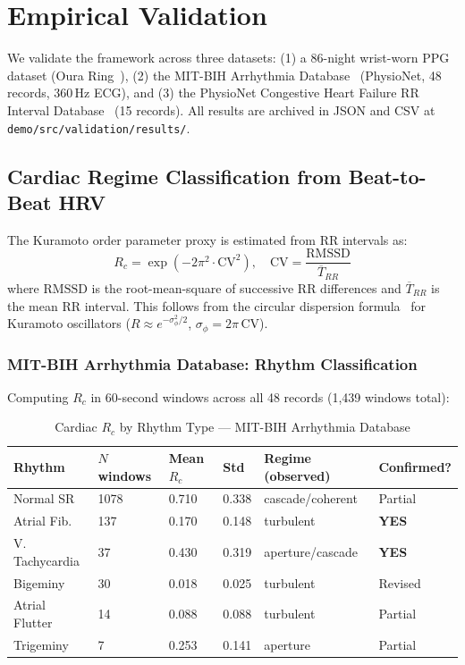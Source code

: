 \documentclass[10pt,twocolumn,a4paper]{article}
\theoremstyle{definition}
\begin{document}
\section{Empirical Validation}
\label{sec:validation}

We validate the framework across three datasets: (1) a 86-night wrist-worn
PPG dataset (Oura Ring~\cite{altini2021promise,derosario2019validity}), (2) the MIT-BIH Arrhythmia Database~\cite{moody2001impact,goldberger2000physiobank} (PhysioNet,
48 records, 360\,Hz ECG), and (3) the PhysioNet Congestive Heart Failure
RR Interval Database~\cite{baim1986survival} (15 records). All results are archived in JSON and CSV
at \texttt{demo/src/validation/results/}.

\subsection{Cardiac Regime Classification from Beat-to-Beat HRV}

The Kuramoto order parameter proxy is estimated from RR intervals as:
\begin{equation}
\label{eq:rc_estimator}
R_c = \exp\!\left(-2\pi^2 \cdot \mathrm{CV}^2\right), \quad
\mathrm{CV} = \frac{\mathrm{RMSSD}}{\overline{T}_{RR}}
\end{equation}
where $\mathrm{RMSSD}$ is the root-mean-square of successive RR differences
and $\overline{T}_{RR}$ is the mean RR interval. This follows from the
circular dispersion formula~\cite{mardia2000directional} for Kuramoto oscillators
($R \approx e^{-\sigma_\phi^2/2}$, $\sigma_\phi = 2\pi\,\mathrm{CV}$).

\subsubsection{MIT-BIH Arrhythmia Database: Rhythm Classification}

Computing $R_c$ in 60-second windows across all 48 records (1,439 windows total):

\begin{table}[H]
\centering
\caption{Cardiac $R_c$ by Rhythm Type --- MIT-BIH Arrhythmia Database}
\label{tab:mitdb_regimes}
\begin{tabular}{llllll}
\toprule
\textbf{Rhythm} & \textbf{$N$ windows} & \textbf{Mean $R_c$} & \textbf{Std} &
\textbf{Regime (observed)} & \textbf{Confirmed?}\\
\midrule
Normal SR   & 1078 & 0.710 & 0.338 & cascade/coherent & Partial\\
Atrial Fib. &  137 & 0.170 & 0.148 & turbulent        & \textbf{YES}\\
V. Tachycardia & 37 & 0.430 & 0.319 & aperture/cascade & \textbf{YES}\\
Bigeminy    &   30 & 0.018 & 0.025 & turbulent        & Revised\\
Atrial Flutter & 14 & 0.088 & 0.088 & turbulent        & Partial\\
Trigeminy   &    7 & 0.253 & 0.141 & aperture         & Partial\\
\bottomrule
\end{tabular}
\end{table}
\end{document}
